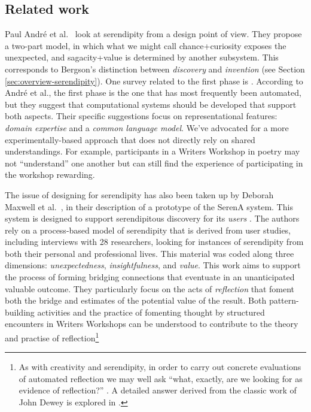 \subsection{Related work} \label{sec:related}

Paul Andr{\'e} et al.~\cite{andre2009discovery} look at serendipity
from a design point of view.  They propose a two-part model, in which
what we might call chance+curiosity exposes the unexpected, and
sagacity+value is determined by another subsystem.  This corresponds
to Bergson's distinction between \emph{discovery} and \emph{invention}
(see Section \ref{sec:overview-serendipity}).  One survey related to
the first phase is \cite{foster2003serendipity}.  According to Andr\'e
et al., the first phase is the one that has most frequently been
automated, but they suggest that computational systems should be
developed that support both aspects.  Their specific suggestions focus
on representational features: \emph{domain expertise} and a
\emph{common language model}.  We've advocated for a more
experimentally-based approach that does not directly rely on shared
understandings.  For example, participants in a Writers Workshop in
poetry may not ``understand'' one another but can still find the
experience of participating in the workshop rewarding.

The issue of designing for serendipity has also been taken up by
Deborah Maxwell et al.~\cite{maxwell2012designing}, in their
description of a prototype of the SerenA system.  This system is
designed to support serendipitous discovery for its \emph{users}
\cite{forth2013serena}.  The authors rely on a process-based model of
serendipity \cite{Makri2012,Makri2012a} that is derived from user
studies, including interviews with 28 researchers, looking for
instances of serendipity from both their personal and professional
lives.  This material was coded along three dimensions:
\emph{unexpectedness}, \emph{insightfulness}, and \emph{value}.  This
work aims to support the process of forming bridging connections that
eventuate in an unanticipated valuable outcome.  They particularly
focus on the acts of \emph{reflection} that foment both the bridge and
estimates of the potential value of the result.  Both pattern-building
activities and the practice of fomenting thought by structured
encounters in Writers Workshops can be understood to contribute to the
theory and practise of reflection\footnote{As with creativity and
  serendipity, in order to carry out concrete evaluations of automated
  reflection we may well ask ``what, exactly, are we looking for as
  evidence of reflection?'' \cite{rodgers2002defining}.  A detailed
  answer derived from the classic work of John Dewey
  \cite{dewey1997we} is explored in \cite{rodgers2002defining}.}

